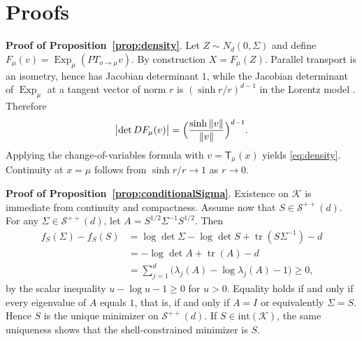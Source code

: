 \documentclass[11pt]{article}
\DeclareMathOperator{\tr}{tr}
\newcommand{\SPD}{\mathcal{S}^{++}}
\newcommand{\Id}{I}
\newcommand{\Exp}{\operatorname{Exp}}
\newcommand{\norm}[1]{\left\lVert #1\right\rVert}
\newcommand{\shell}{\mathcal{K}}
\newcommand{\T}{\mathsf{T}}
\begin{document}











\appendix
\section{Proofs}

\noindent \textbf{Proof of Proposition~\ref{prop:density}}. Let $Z\sim N_d(0,\Sigma)$ and define $F_\mu(v)=\Exp_\mu(PT_{o\to\mu}v)$. By construction $X=F_\mu(Z)$. Parallel transport is an isometry, hence has Jacobian determinant $1$, while the Jacobian determinant of $\Exp_\mu$ at a tangent vector of norm $r$ is $(\sinh r/r)^{d-1}$ in the Lorentz model \citet[Sec.~3.2]{nagano_2019_WrappedNormalDistribution}. Therefore
\[
\bigl|\det D F_\mu(v)\bigr|
=
\Bigl(\frac{\sinh \norm{v}}{\norm{v}}\Bigr)^{d-1}.
\]
Applying the change-of-variables formula with $v=\T_\mu(x)$ yields \eqref{eq:density}. Continuity at $x=\mu$ follows from $\sinh r/r\to 1$ as $r\to 0$.

\medskip
\noindent \textbf{Proof of Proposition~\ref{prop:conditionalSigma}}. Existence on $\shell$ is immediate from continuity and compactness. Assume now that $S\in\SPD(d)$. For any $\Sigma\in\SPD(d)$, let $A=S^{1/2}\Sigma^{-1}S^{1/2}$. Then
\begin{align*}
f_S(\Sigma)-f_S(S)
&= \log\det\Sigma-\log\det S+\tr(S\Sigma^{-1})-d\\
&= -\log\det A+\tr(A)-d\\
&= \sum_{j=1}^d \bigl(\lambda_j(A)-\log\lambda_j(A)-1\bigr)\ge 0,
\end{align*}
by the scalar inequality $u-\log u-1\ge 0$ for $u>0$. Equality holds if and only if every eigenvalue of $A$ equals $1$, that is, if and only if $A=\Id$ or equivalently $\Sigma=S$. Hence $S$ is the unique minimizer on $\SPD(d)$. If $S\in \mathrm{int}(\shell)$, the same uniqueness shows that the shell-constrained minimizer is $S$.
\end{document}
